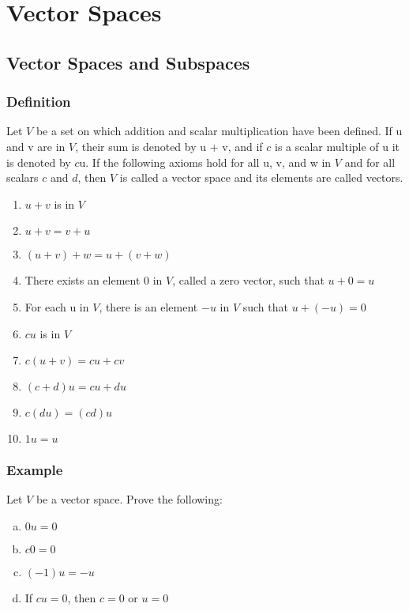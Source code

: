 \chapter{Vector Spaces}

\section{Vector Spaces and Subspaces}

\subsection*{Definition}
Let $V$ be a set on which addition and scalar multiplication have been defined.
If u and v are in $V$, their sum is denoted by u + v, and if $c$ is a scalar multiple
of u it is denoted by $c$u. If the following axioms hold for all u, v, and w in $V$
and for all scalars $c$ and $d$, then $V$ is called a vector space and its elements are called vectors.
\begin{enumerate}
    \item $u+v$ is in $V$
    \item $u+v=v+u$
    \item $(u+v)+w=u+(v+w)$
    \item There exists an element 0 in $V$, called a zero vector, such that $u + 0 = u$
    \item For each u in $V$, there is an element $-u$ in $V$ such that $u + (-u) = 0$
    \item $cu$ is in $V$
    \item $c(u+v)=cu+cv$
    \item $(c+d)u=cu+du$
    \item $c(du)=(cd)u$
    \item $1u=u$
\end{enumerate}

\subsection*{Example}
Let $V$ be a vector space. Prove the following:
\begin{enumerate}[(a)]
    \item $0u = 0$
    \item $c0 = 0$
    \item $(-1) u = -u$
    \item If $cu = 0$, then $c = 0$ or $u = 0$
\end{enumerate}


